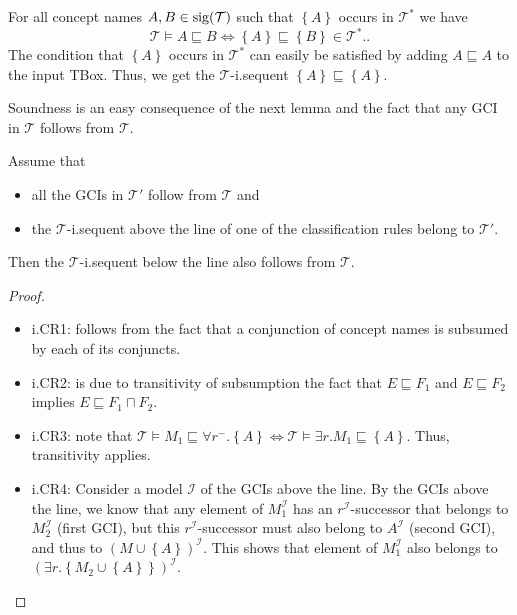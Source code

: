 \addtocounter{definition}{3}
\begin{prop}
	For all concept names $A, B \in \operatorname{\text{sig}}(\mathcal{T})$ such that $ \left\{ A \right\}$ occurs in $\mathcal{T}^*$ we have
	\[
	\mathcal{T} \vDash A \sqsubseteq B \iff \left\{ A \right\} \sqsubseteq \left\{ B \right\} \in \mathcal{T}^*.
	.\]
	The condition that $ \left\{ A \right\}$ occurs in $\mathcal{T}^*$ can easily be satisfied by adding $A \sqsubseteq A$ to the input TBox.
	Thus, we get the $\mathcal{T}$-i.sequent $\left\{ A \right\} \sqsubseteq \left\{ A \right\}$.
\end{prop}
Soundness is an easy consequence of the next lemma and the fact that any GCI in $\mathcal{T}$ follows from $\mathcal{T}$.
\begin{lemma}[soundness]
	Assume that
	\begin{itemize}
		\item all the GCIs in $\mathcal{T}'$ follow from $\mathcal{T}$ and
		\item the $\mathcal{T}$-i.sequent above the line of one of the classification rules belong to $\mathcal{T}'$.
	\end{itemize}
	Then the $\mathcal{T}$-i.sequent below the line also follows from $\mathcal{T}$.
\end{lemma}
\begin{proof}
	\begin{itemize}
		\item i.CR1: follows from the fact that a conjunction of concept names is subsumed by each of its conjuncts.
		\item i.CR2: is due to transitivity of subsumption the fact that $E \sqsubseteq F_1$ and $E \sqsubseteq F_2$ implies $E \sqsubseteq F_1 \sqcap F_2$.
		\item i.CR3: note that $\mathcal{T} \vDash M_1 \sqsubseteq \forall r^-.\left\{ A \right\} \iff \mathcal{T} \vDash \exists r.M_1 \sqsubseteq \left\{ A \right\}$.
			Thus, transitivity applies.
		\item i.CR4: Consider a model $\mathcal{I}$ of the GCIs above the line.
			By the GCIs above the line, we know that any element of $M_1^{\mathcal{I}}$ has an
			$r^{\mathcal{I}}$-successor that belongs to $M_2^{\mathcal{I}}$ (first GCI),
			but this $r^{\mathcal{I}}$-successor must also belong to $A^{\mathcal{I}}$ (second GCI),
			and thus to $\left( M \cup \left\{ A \right\} \right)^{\mathcal{I}}$.
			This shows that element of $M_1^{\mathcal{I}}$ also belongs to $\left( \exists r.\left\{ M_2 \cup \left\{ A \right\} \right\} \right)^{\mathcal{I}}$.
			\qedhere
	\end{itemize}
\end{proof}
